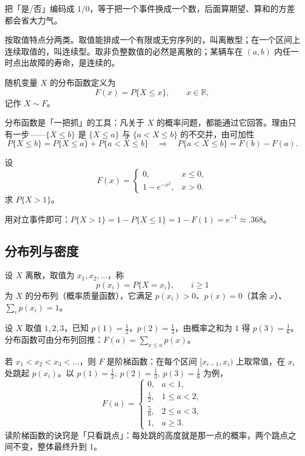 把「是/否」编码成 $1/0$，等于把一个事件换成一个数，后面算期望、算和的方差都会省大力气。

按取值特点分两类。取值能排成一个有限或无穷序列的，叫离散型；在一个区间上连续取值的，叫连续型。取非负整数值的必然是离散的；某辆车在 $(a,b)$ 内任一时点出故障的寿命，是连续的。

\begin{definition}[分布函数]
随机变量 $X$ 的分布函数定义为
\[
F(x)=P\{X\le x\},\qquad x\in\mathbb{R},
\]
记作 $X\sim F$。
\end{definition}

分布函数是「一把抓」的工具：凡关于 $X$ 的概率问题，都能通过它回答。理由只有一步——$\{X\le b\}$ 是 $\{X\le a\}$ 与 $\{a<X\le b\}$ 的不交并，由可加性
\[
P\{X\le b\}=P\{X\le a\}+P\{a<X\le b\}
\quad\Longrightarrow\quad
P\{a<X\le b\}=F(b)-F(a).
\]

\begin{example}
设
\[
F(x)=\begin{cases}0, & x\le 0,\\ 1-e^{-x^2}, & x>0 .\end{cases}
\]
求 $P\{X>1\}$。
\end{example}

用对立事件即可：$P\{X>1\}=1-P\{X\le 1\}=1-F(1)=e^{-1}\approx .368$。

\subsection{分布列与密度}

\begin{definition}[分布列]
设 $X$ 离散，取值为 $x_1,x_2,\dots$，称
\[
p(x_i)=P\{X=x_i\},\qquad i\ge 1
\]
为 $X$ 的分布列（概率质量函数），它满足 $p(x_i)>0$、$p(x)=0$（其余 $x$）、$\sum_i p(x_i)=1$。
\end{definition}

\begin{example}
设 $X$ 取值 $1,2,3$，已知 $p(1)=\frac12$，$p(2)=\frac13$，由概率之和为 $1$ 得 $p(3)=\frac16$。
分布函数可由分布列回推：$F(a)=\sum_{x\le a}p(x)$。
\end{example}

若 $x_1<x_2<x_3<\dots$，则 $F$ 是阶梯函数：在每个区间 $[x_{i-1},x_i)$ 上取常值，在 $x_i$ 处跳起 $p(x_i)$。以 $p(1)=\frac12,\ p(2)=\frac13,\ p(3)=\frac16$ 为例，
\[
F(a)=\begin{cases}
0, & a<1,\\
\frac12, & 1\le a<2,\\
\frac56, & 2\le a<3,\\
1, & a\ge 3 .
\end{cases}
\]
读阶梯函数的诀窍是「只看跳点」：每处跳的高度就是那一点的概率，两个跳点之间不变，整体最终升到 $1$。

